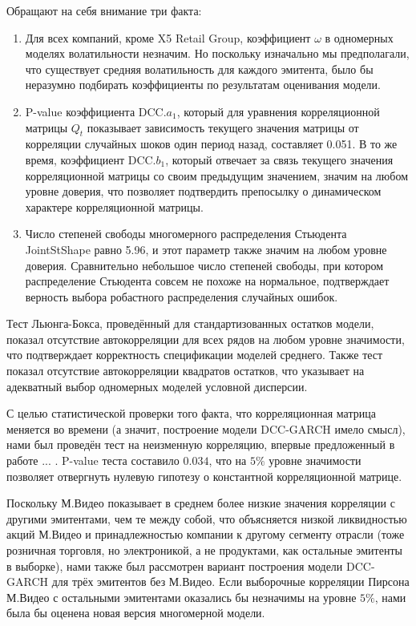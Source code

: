\documentclass[a4paper,12pt,twoside]{article}
\begin{document}
Обращают на себя внимание три факта:
\begin{enumerate}
    \item Для всех компаний, кроме X5 Retail Group, коэффициент $\omega$ в одномерных моделях волатильности незначим. Но поскольку изначально мы предполагали, что существует средняя волатильность для каждого эмитента, было бы неразумно подбирать коэффициенты по результатам оценивания модели.
    \item P-value коэффициента DCC.$a_1$, который для уравнения корреляционной матрицы $Q_t$ показывает зависимость текущего значения матрицы от корреляции случайных шоков один период назад, составляет 0.051. В то же время, коэффициент DCC.$b_1$, который отвечает за связь текущего значения корреляционной матрицы со своим предыдущим значением, значим на любом уровне доверия, что позволяет подтвердить препосылку о динамическом характере корреляционной матрицы.
    \item Число степеней свободы многомерного распределения Стьюдента JointStShape равно 5.96, и этот параметр также значим на любом уровне доверия. Сравнительно небольшое число степеней свободы, при котором распределение Стьюдента совсем не похоже на нормальное, подтверждает верность выбора робастного распределения случайных ошибок.
\end{enumerate}

Тест Льюнга-Бокса, проведённый для стандартизованных остатков модели, показал отсутствие автокорреляции для всех рядов на любом уровне значимости, что подтверждает корректность спецификации моделей среднего. Также тест показал отсутствие автокорреляции квадратов остатков, что указывает на адекватный выбор одномерных моделей условной дисперсии.

С целью статистической проверки того факта, что корреляционная матрица меняется во времени (а значит, построение модели DCC-GARCH имело смысл), нами был проведён тест на неизменную корреляцию, впервые предложенный в работе ... . P-value теста составило $0.034$, что на $5\%$ уровне значимости позволяет отвергнуть нулевую гипотезу о константной корреляционной матрице.

Поскольку М.Видео показывает в среднем более низкие значения корреляции с другими эмитентами, чем те между собой, что объясняется низкой ликвидностью акций М.Видео и принадлежностью компании к другому сегменту отрасли (тоже розничная торговля, но электроникой, а не продуктами, как остальные эмитенты в выборке), нами также был рассмотрен вариант построения модели DCC-GARCH для трёх эмитентов без М.Видео. Если выборочные корреляции Пирсона М.Видео с остальными эмитентами оказались бы незначимы на уровне $5\%$, нами была бы оценена новая версия многомерной модели.
\end{document}
